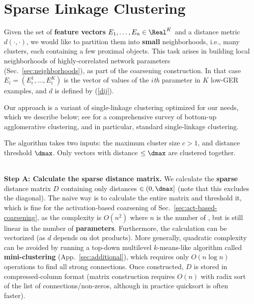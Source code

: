 \documentclass{article} %
\begin{document}
\section{Sparse Linkage Clustering}
\label{sparse_linkage_clustering}
Given the set of \textbf{feature vectors} $E_1, \dots, E_n \in \Real^K$ and a distance metric $d(\cdot, \cdot)$, we would like to partition them into \textbf{small} neighborhoods, i.e., many clusters, each containing a few proximal objects. This task arises in building local neighborhoods of highly-correlated network parameters (Sec.~\ref{sec:neighborhoods}), as part of the coarsening construction. In that case $E_i=(E^1_i,\dots,E^K_i)$ is the vector of values of the $i${\it th} parameter in $K$ low-GER examples, and $d$ is defined by (\ref{dij}).

Our approach is a variant of single-linkage clustering optimized for our needs, which we describe below; see \cite{clustering_book} for a comprehensive survey of bottom-up agglomerative clustering, and in particular, standard single-linkage clustering.

The algorithm takes two inputs: the maximum cluster size $c > 1$, and distance threshold $\dmax$. Only vectors with distance $\leq \dmax$ are clustered together.

{\mbox{}}\\ \noindent
\textbf{Step A: Calculate the sparse distance matrix.} We calculate the \textbf{sparse} distance matrix $D$ containing only distances $\in (0, \dmax]$ (note that this excludes the diagonal). The naive way is to calculate the entire matrix and threshold it, which is fine for the activation-based coarsening of Sec.~\ref{sec:act-based-coarsening}, as the complexity is $O(n^2)$ where $n$ is the number of , but is still linear in the number of \textbf{parameters}. Furthermore, the calculation can be vectorized (as $d$ depends on dot products). More generally, quadratic complexity can be avoided by running a top-down multilevel $k$-means-like algorithm called \textbf{mini-clustering} (App.~\ref{sec:additional}), which requires only $O(n \log n)$ operations to find all strong connections. Once constructed, $D$ is stored in compressed-column format (matrix construction requires $O(n)$ with radix sort of the list of connections/non-zeros, although in practice quicksort is often faster). 
\end{document}
